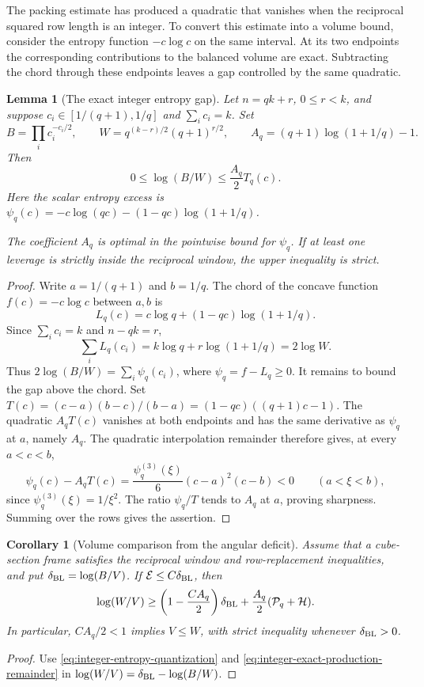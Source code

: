 \documentclass[11pt,a4paper]{article}
\newtheorem{lemma}[theorem]{Lemma}
\newtheorem{corollary}[theorem]{Corollary}
\theoremstyle{remark}\newtheorem{remark}[theorem]{Remark}
\numberwithin{equation}{section}
\begin{document}
The packing estimate has produced a quadratic that vanishes when
the reciprocal squared row length is an integer. To convert this
estimate into a volume bound, consider the entropy function
\(-c\log c\) on the same interval. At its two endpoints the
corresponding contributions to the balanced volume are exact.
Subtracting the chord through these endpoints leaves a gap controlled
by the same quadratic.

\begin{lemma}[The exact integer entropy gap]
\label{lem:integer-entropy-gap}
Let $n=qk+r$, $0\le r<k$, and suppose $c_i\in[1/(q+1),1/q]$
and $\sum_i c_i=k$.  Set
\[
 B=\prod_i c_i^{-c_i/2},\qquad
 W=q^{(k-r)/2}(q+1)^{r/2},\qquad
 A_q=(q+1)\log(1+1/q)-1.
\]
Then
\begin{equation}\label{eq:integer-entropy-quantization}
 0\le\log(B/W)\le\frac{A_q}{2}T_q(c).
\end{equation}
Here the scalar entropy excess is
\(\psi_q(c)=-c\log(qc)-(1-qc)\log(1+1/q)\).

The coefficient $A_q$ is optimal in the pointwise bound for $\psi_q$.  If at least one leverage is strictly inside
the reciprocal window, the upper inequality is strict.
\end{lemma}
\begin{proof}
Write $a=1/(q+1)$ and $b=1/q$.  The chord of the concave function
$f(c)=-c\log c$ between $a,b$ is
\[
 L_q(c)=c\log q+(1-qc)\log(1+1/q).
\]
Since $\sum_i c_i=k$ and $n-qk=r$,
\[
 \sum_iL_q(c_i)=k\log q+r\log(1+1/q)=2\log W.
\]
Thus \(2\log(B/W)=\sum_i\psi_q(c_i)\), where \(\psi_q=f-L_q\ge0\).
It remains to bound the gap above the chord. Set
\(T(c)=(c-a)(b-c)/(b-a)=(1-qc)((q+1)c-1)\). The quadratic
\(A_q T(c)\) vanishes at both endpoints and has the same derivative
as \(\psi_q\) at \(a\), namely \(A_q\). The quadratic interpolation
remainder therefore gives, at every \(a<c<b\),
\[
 \psi_q(c)-A_qT(c)=\frac{\psi_q^{(3)}(\xi)}{6}(c-a)^2(c-b)<0
 \qquad (a<\xi<b),
\]
since \(\psi_q^{(3)}(\xi)=1/\xi^2\). The ratio \(\psi_q/T\) tends
to \(A_q\) at \(a\), proving sharpness. Summing over the rows gives
the assertion.

\end{proof}

\begin{corollary}[Volume comparison from the angular deficit]
\label{cor:integer-direct-criterion}
Assume that a cube-section frame satisfies the reciprocal window and
row-replacement inequalities, and put
$\delta_{\rm BL}=\log(B/V)$.  If
$\mathcal E\le C\delta_{\rm BL}$, then
\[
 \log(W/V)\ge
 \left(1-\frac{CA_q}{2}\right)\delta_{\rm BL}
 +\frac{A_q}{2}(\mathcal P_q+\mathcal H).
\]
In particular, $CA_q/2<1$ implies $V\le W$, with strict inequality
whenever $\delta_{\rm BL}>0$.
\end{corollary}
\begin{proof}
Use \eqref{eq:integer-entropy-quantization} and
\eqref{eq:integer-exact-production-remainder} in
$\log(W/V)=\delta_{\rm BL}-\log(B/W)$.
\end{proof}
\end{document}
